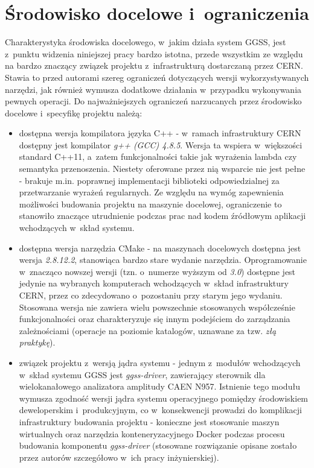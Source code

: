 \section{Środowisko docelowe i~ograniczenia}
Charakterystyka środowiska docelowego, w~jakim działa system GGSS, jest z~punktu widzenia niniejszej pracy bardzo istotna, przede wszystkim ze względu na bardzo znaczący związek projektu z~infrastrukturą dostarczaną przez CERN. Stawia to przed autorami szereg ograniczeń dotyczących wersji wykorzystywanych narzędzi, jak również wymusza dodatkowe działania w~przypadku wykonywania pewnych operacji. Do najważniejszych ograniczeń narzucanych przez środowisko docelowe i~specyfikę projektu należą:
\begin{itemize}
    \item dostępna wersja kompilatora języka C++ - w~ramach infrastruktury CERN dostępny jest kompilator \emph{g++ (GCC) 4.8.5}. Wersja ta wspiera w~większości standard C++11, a~zatem funkcjonalności takie jak wyrażenia lambda czy semantyka przenoszenia. Niestety oferowane przez nią wsparcie nie jest pełne - brakuje m.in. poprawnej implementacji biblioteki odpowiedzialnej za przetwarzanie wyrażeń regularnych. Ze względu na wymóg zapewnienia możliwości budowania projektu na maszynie docelowej, ograniczenie to stanowiło znaczące utrudnienie podczas prac nad kodem źródłowym aplikacji wchodzących w~skład systemu.
    \item dostępna wersja narzędzia CMake - na maszynach docelowych dostępna jest wersja \emph{2.8.12.2}, stanowiąca bardzo stare wydanie narzędzia. Oprogramowanie w~znacząco nowszej wersji (tzn. o~numerze wyższym od \emph{3.0}) dostępne jest jedynie na wybranych komputerach wchodzących w~skład infrastruktury CERN, przez co zdecydowano o~pozostaniu przy starym jego wydaniu. Stosowana wersja nie zawiera wielu powszechnie stosowanych współcześnie funkcjonalności oraz charakteryzuje się innym podejściem do zarządzania zależnościami (operacje na poziomie katalogów, uznawane za tzw. \emph{złą praktykę}).
    \item związek projektu z~wersją jądra systemu - jednym z~modułów wchodzących w~skład systemu GGSS jest \emph{ggss-driver}, zawierający sterownik dla wielokanałowego analizatora amplitudy CAEN N957. Istnienie tego modułu wymusza zgodność wersji jądra systemu operacyjnego pomiędzy środowiskiem deweloperskim i~produkcyjnym, co w~konsekwencji prowadzi do komplikacji infrastruktury budowania projektu - konieczne jest stosowanie maszyn wirtualnych oraz narzędzia konteneryzacyjnego Docker podczas procesu budowania komponentu \emph{ggss-driver} (stosowane rozwiązanie opisane zostało przez autorów szczegółowo w~ich pracy inżynierskiej).

\end{itemize}
